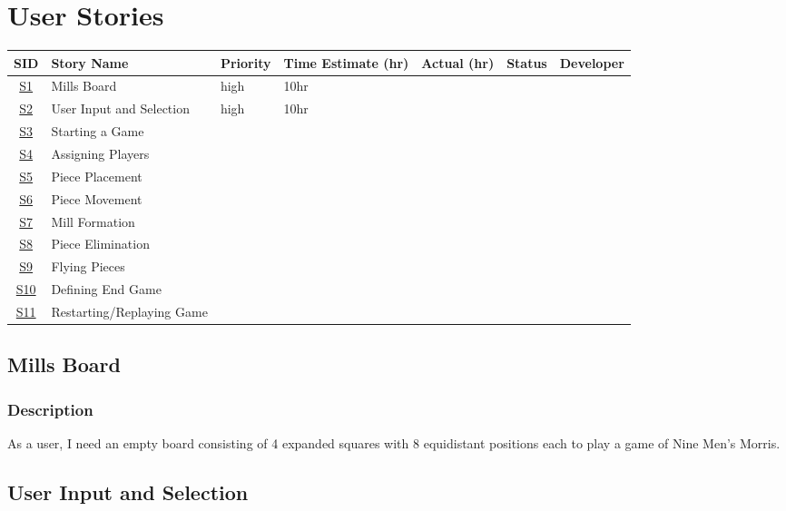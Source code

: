 \documentclass[11pt]{article}
\begin{document}
\section{User Stories}
\label{sec:orge6e0be8}
\begin{center}
\begin{tabular}{|c|p{3.5cm}|l|p{1.5cm}|l|l|l|}
\hline
SID & Story Name & Priority & Time Estimate (hr) & Actual (hr) & Status & Developer\\
\hline
\hyperref[sec:org4f08a4e]{S1} & Mills Board & high & 10hr &  &  & \\
\hyperref[sec:org72f35e1]{S2} & User Input and Selection & high & 10hr &  &  & \\
\hyperref[sec:org4d8fe43]{S3} & Starting a Game &  &  &  &  & \\
\hyperref[sec:org244707a]{S4} & Assigning Players &  &  &  &  & \\
\hyperref[sec:org63fc355]{S5} & Piece Placement &  &  &  &  & \\
\hyperref[sec:org78c1c14]{S6} & Piece Movement &  &  &  &  & \\
\hyperref[sec:orga40d8ea]{S7} & Mill Formation &  &  &  &  & \\
\hyperref[sec:org52dc15a]{S8} & Piece Elimination &  &  &  &  & \\
\hyperref[sec:org492d4f7]{S9} & Flying Pieces &  &  &  &  & \\
\hyperref[sec:orgbb6ee55]{S10} & Defining End Game &  &  &  &  & \\
\hyperref[sec:orga6c6496]{S11} & Restarting/Replaying Game &  &  &  &  & \\
\hline
\end{tabular}
\end{center}

\subsection{Mills Board}
\label{sec:org4f08a4e}
\subsubsection*{Description}
\label{sec:org8dd567d}
As a user, I need an empty board consisting of 4 expanded squares with 8 equidistant positions
each to play a game of Nine Men's Morris.
\subsection{User Input and Selection}
\label{sec:org72f35e1}
\end{document}
